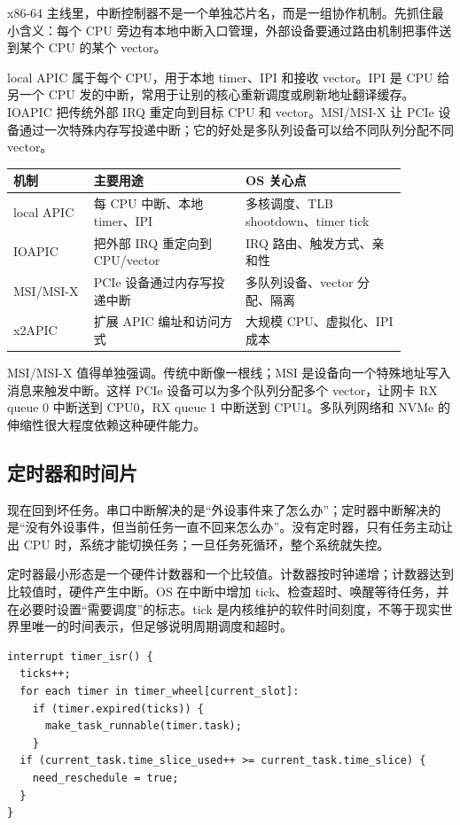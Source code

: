 x86-64 主线里，中断控制器不是一个单独芯片名，而是一组协作机制。先抓住最小含义：每个 CPU 旁边有本地中断入口管理，外部设备要通过路由机制把事件送到某个 CPU 的某个 vector。

local APIC 属于每个 CPU，用于本地 timer、IPI 和接收 vector。IPI 是 CPU 给另一个 CPU 发的中断，常用于让别的核心重新调度或刷新地址翻译缓存。IOAPIC 把传统外部 IRQ 重定向到目标 CPU 和 vector。MSI/MSI-X 让 PCIe 设备通过一次特殊内存写投递中断；它的好处是多队列设备可以给不同队列分配不同 vector。

\begin{longtable}{p{0.18\linewidth}p{0.34\linewidth}p{0.36\linewidth}}
\toprule
机制 & 主要用途 & OS 关心点 \\
\midrule
local APIC & 每 CPU 中断、本地 timer、IPI & 多核调度、TLB shootdown、timer tick \\
IOAPIC & 把外部 IRQ 重定向到 CPU/vector & IRQ 路由、触发方式、亲和性 \\
MSI/MSI-X & PCIe 设备通过内存写投递中断 & 多队列设备、vector 分配、隔离 \\
x2APIC & 扩展 APIC 编址和访问方式 & 大规模 CPU、虚拟化、IPI 成本 \\
\bottomrule
\end{longtable}

MSI/MSI-X 值得单独强调。传统中断像一根线；MSI 是设备向一个特殊地址写入消息来触发中断。这样 PCIe 设备可以为多个队列分配多个 vector，让网卡 RX queue 0 中断送到 CPU0，RX queue 1 中断送到 CPU1。多队列网络和 NVMe 的伸缩性很大程度依赖这种硬件能力。

\subsection{定时器和时间片}

现在回到坏任务。串口中断解决的是“外设事件来了怎么办”；定时器中断解决的是“没有外设事件，但当前任务一直不回来怎么办”。没有定时器，只有任务主动让出 CPU 时，系统才能切换任务；一旦任务死循环，整个系统就失控。

定时器最小形态是一个硬件计数器和一个比较值。计数器按时钟递增；计数器达到比较值时，硬件产生中断。OS 在中断中增加 tick、检查超时、唤醒等待任务，并在必要时设置“需要调度”的标志。tick 是内核维护的软件时间刻度，不等于现实世界里唯一的时间表示，但足够说明周期调度和超时。

\begin{lstlisting}
interrupt timer_isr() {
  ticks++;
  for each timer in timer_wheel[current_slot]:
    if (timer.expired(ticks)) {
      make_task_runnable(timer.task);
    }
  if (current_task.time_slice_used++ >= current_task.time_slice) {
    need_reschedule = true;
  }
}
\end{lstlisting}

